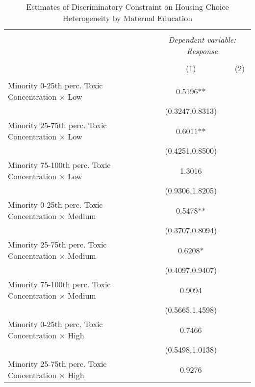  \begin{table}[H] \tiny \centering \begin{threeparttable} \captionsetup{justification=centering}   \caption{Estimates of Discriminatory Constraint on Housing Choice \\ Heterogeneity by Maternal Education }      \label{tab:heterogeneityedu}  \begin{tabular}{@{\extracolsep{5pt}}lcc} \\[-1.8ex]\hline \hline \\[-1.8ex]  & \multicolumn{2}{c}{\textit{Dependent variable: {\it  Response}}} \\  \cline{2-3}   \\[-1.8ex] & (1) & (2)  \\ \hline \\[-1.8ex]         
\hline
Minority 0-25th perc. Toxic Concentration $\times$ Low&      0.5196** &               \\
                    &(0.3247,0.8313)   &               \\
Minority 25-75th perc. Toxic Concentration $\times$ Low&      0.6011** &               \\
                    &(0.4251,0.8500)   &               \\
Minority 75-100th perc. Toxic Concentration $\times$ Low&      1.3016   &               \\
                    &(0.9306,1.8205)   &               \\
Minority 0-25th perc. Toxic Concentration $\times$ Medium&      0.5478** &               \\
                    &(0.3707,0.8094)   &               \\
Minority 25-75th perc. Toxic Concentration $\times$ Medium&      0.6208*  &               \\
                    &(0.4097,0.9407)   &               \\
Minority 75-100th perc. Toxic Concentration $\times$ Medium&      0.9094   &               \\
                    &(0.5665,1.4598)   &               \\
Minority 0-25th perc. Toxic Concentration $\times$ High&      0.7466   &               \\
                    &(0.5498,1.0138)   &               \\
Minority 25-75th perc. Toxic Concentration $\times$ High&      0.9276   &               \\

\end{tabular}
\end{threeparttable}
\end{table}
